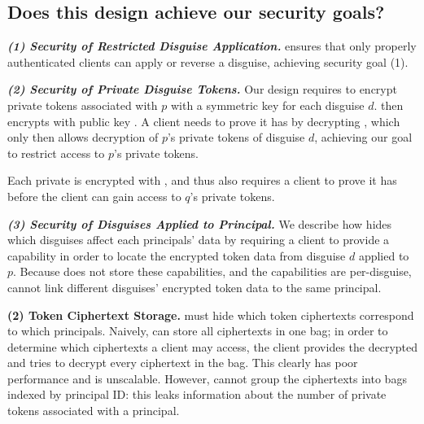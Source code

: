 \subsection{Does this design achieve our security goals?}
\label{sec:achievegoals}
\vspace{6pt}\noindent\textbf{\emph{(1) Security of Restricted Disguise Application.}}
\sys ensures that only properly authenticated clients can apply or
reverse a disguise, achieving security goal (1).

\vspace{6pt}\noindent\textbf{\emph{(2) Security of Private Disguise Tokens.}}
Our design requires \sys to encrypt private \tdata{} tokens associated with $p$ with a symmetric key
 for each disguise $d$. \sys then encrypts  with public key .  
A client needs to prove it has  by decrypting , which only then allows decryption
of $p$'s private tokens of disguise $d$, achieving our goal to restrict access to $p$'s private
tokens.

Each private  is encrypted with , and thus also requires a client to prove it has
 before the client can gain access to $q$'s private tokens.

\vspace{6pt}\noindent\textbf{\emph{(3) Security of Disguises Applied to Principal.}}
We describe how \sys hides which disguises affect each principals' data by requiring a client to
provide a capability  in order to locate the encrypted token data from disguise $d$ applied
to $p$. Because \sys does not store these capabilities, and the capabilities are per-disguise, \sys
cannot link different disguises' encrypted token data to the same principal.

\iffalse
\vspace{6pt}\noindent\textbf{(2) \tdata{} Token Ciphertext Storage.}
\sys must hide which token ciphertexts correspond to which principals.  Naively, \sys can store
all ciphertexts in one bag; in order to determine which ciphertexts a client may access, the client
provides the decrypted  and \sys tries to decrypt every ciphertext in the bag. This clearly
has poor performance and is unscalable.
However, \sys cannot group the ciphertexts into bags indexed by principal ID: this leaks information
about the number of private tokens associated with a principal.

